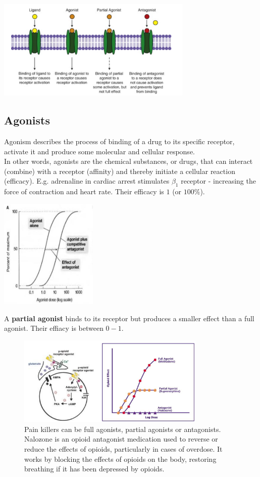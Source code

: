 \documentclass{book}
\begin{document}
\includegraphics[width=0.7\textwidth, center]{images/image16.png}

\subsection{Agonists}
Agonism describes the process of binding of a drug to its specific receptor, activate it and produce some molecular and cellular response.
\\
In other words, agonists are the chemical substances, or drugs, that can interact (combine) with a receptor (affinity) and thereby initiate a cellular reaction (efficacy).
E.g. adrenaline in cardiac arrest stimulates $\beta_1$ receptor - increasing the force of contraction and heart rate.
Their efficacy is $1$ (or $100\%$).

\includegraphics[width=0.35\textwidth, center]{images/image17.png}

A \textbf{partial agonist} binds to its receptor but produces a smaller effect than a full agonist.
Their effiacy is between $0-1$.

\begin{figure}[H]
    \includegraphics[width=0.8\textwidth, center]{images/image18.png}
    \caption{Pain killers can be full agonists, partial agonists or antagonists. Nalozone is an opioid antagonist medication used to reverse or reduce the effects of opioids, particularly in cases of overdose. It works by blocking the effects of opioids on the body, restoring breathing if it has been depressed by opioids.}
\end{figure}
\end{document}
